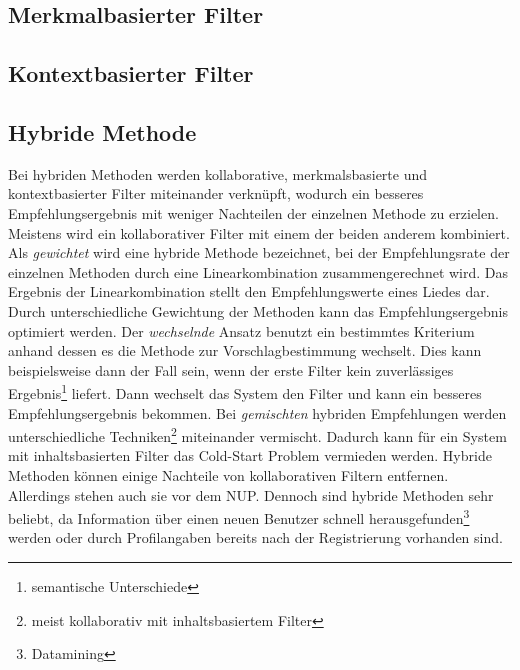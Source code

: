 \documentclass[twosided,a4,10pt]{article}
\begin{document}
\begin{multicols}{2}
		\subsection{Merkmalbasierter Filter}
		\subsection{Kontextbasierter Filter}				
		\subsection{Hybride Methode}
		Bei hybriden Methoden werden kollaborative, merkmalsbasierte und kontextbasierter Filter miteinander verknüpft, wodurch ein besseres Empfehlungsergebnis mit weniger Nachteilen der einzelnen Methode zu erzielen. Meistens wird ein kollaborativer Filter mit einem der beiden anderem kombiniert.\newline
		Als \textit{gewichtet} wird eine hybride Methode bezeichnet, bei der Empfehlungsrate der einzelnen Methoden durch eine Linearkombination zusammengerechnet wird. Das Ergebnis der Linearkombination stellt den Empfehlungswerte eines Liedes dar. Durch unterschiedliche Gewichtung der Methoden kann das Empfehlungsergebnis optimiert werden. Der \textit{wechselnde} Ansatz benutzt ein bestimmtes Kriterium anhand dessen es die Methode zur Vorschlagbestimmung wechselt. Dies kann beispielsweise dann der Fall sein, wenn der erste Filter kein zuverlässiges Ergebnis\footnote[6]{semantische Unterschiede} liefert. Dann wechselt das System den Filter und kann ein besseres Empfehlungsergebnis bekommen. Bei \textit{gemischten} hybriden Empfehlungen werden unterschiedliche Techniken\footnote[7]{meist kollaborativ mit inhaltsbasiertem Filter} miteinander vermischt. Dadurch kann für ein System mit inhaltsbasierten Filter das Cold-Start Problem vermieden werden.\newline
		Hybride Methoden können einige Nachteile von kollaborativen Filtern entfernen. Allerdings stehen auch sie vor dem NUP. Dennoch sind hybride Methoden sehr beliebt, da Information über einen neuen Benutzer schnell herausgefunden\footnote[8]{Datamining} werden oder durch Profilangaben bereits nach der Registrierung vorhanden sind. \cite{burke}

\end{multicols}
\end{document}
